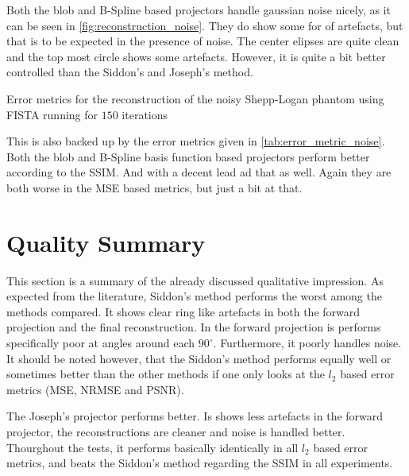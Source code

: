 Both the blob and B-Spline based projectors handle gaussian noise nicely, as it can be seen in
\autoref{fig:reconstruction_noise}. They do show some for of artefacts, but that is to be expected
in the presence of noise. The center elipses are quite clean and the top most circle shows some
artefacts. However, it is quite a bit better controlled than the Siddon's and Joseph's method.

\begin{table}[h]%
	\centering
	\caption{Error metrics for the reconstruction of the noisy Shepp-Logan phantom using FISTA
		running for \(150\) iterations}%
	\label{tab:error_metric_noise}
\end{table}

This is also backed up by the error metrics given in \autoref{tab:error_metric_noise}. Both the
blob and B-Spline basis function based projectors perform better according to the \gls{SSIM}. And
with a decent lead ad that as well. Again they are both worse in the \gls{MSE} based metrics, but
just a bit at that.

\section{Quality Summary}\label{sec:experiments_quality_projection}

This section is a summary of the already discussed qualitative impression. As expected from the
literature, Siddon's method performs the worst among the methods compared. It shows clear ring like
artefacts in both the forward projection and the final reconstruction. In the forward projection is
performs specifically poor at angles around each \(90^\circ\). Furthermore, it poorly handles noise.
It should be noted however, that the Siddon's method performs equally well or sometimes better than
the other methods if one only looks at the \(l_2\) based error metrics (\gls{MSE}, \gls{NRMSE} and
\gls{PSNR}).

The Joseph's projector performs better. Is shows less artefacts in the forward projector, the
reconstructions are cleaner and noise is handled better. Thourghout the tests, it performs basically
identically in all \(l_2\) based error metrics, and beats the Siddon's method regarding the
\gls{SSIM} in all experiments.

